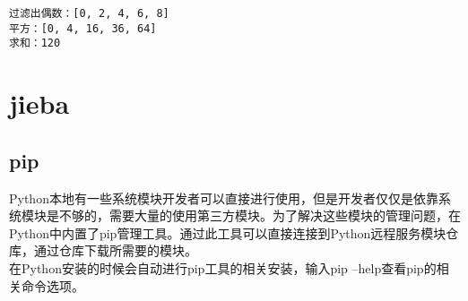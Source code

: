 \begin{tcolorbox}
    \begin{verbatim}
过滤出偶数：[0, 2, 4, 6, 8]
平方：[0, 4, 16, 36, 64]
求和：120
\end{verbatim}
\end{tcolorbox}

\newpage

\section{jieba}

\subsection{pip}

Python本地有一些系统模块开发者可以直接进行使用，但是开发者仅仅是依靠系统模块是不够的，需要大量的使用第三方模块。为了解决这些模块的管理问题，在Python中内置了pip管理工具。通过此工具可以直接连接到Python远程服务模块仓库，通过仓库下载所需要的模块。\\

在Python安装的时候会自动进行pip工具的相关安装，输入pip --help查看pip的相关命令选项。

\begin{table}[H]
    \centering
    \caption{pip命令}
\end{table}

\vspace{0.5cm}

